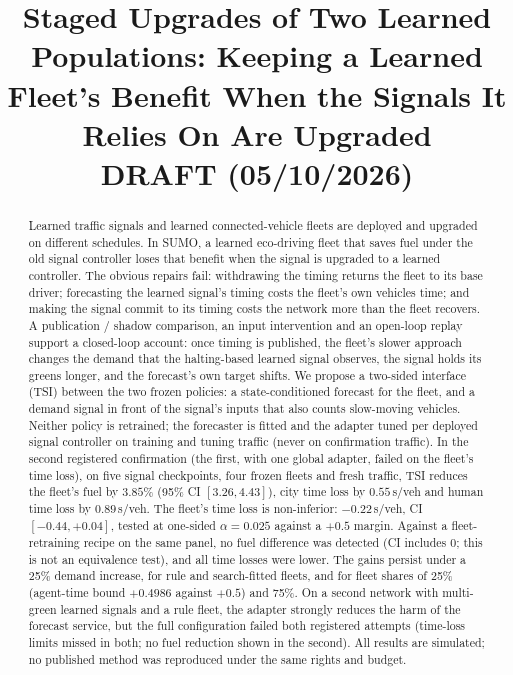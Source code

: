 \documentclass[11pt]{article}
\title{Staged Upgrades of Two Learned Populations: Keeping a Learned Fleet's Benefit When the Signals It Relies On Are Upgraded\\[4pt]
\large DRAFT (05/10/2026)}
\date{}
\begin{document}
\maketitle

\begin{abstract}
Learned traffic signals and learned connected-vehicle fleets are deployed and upgraded on different schedules. In SUMO, a learned
eco-driving fleet that saves fuel under the old signal controller loses that benefit when the signal is upgraded to a learned controller.
The obvious repairs fail: withdrawing the timing returns the fleet to its base driver; forecasting the learned signal's timing costs the
fleet's own vehicles time; and making the signal commit to its timing costs the network more than the fleet recovers. A publication /
shadow comparison, an input intervention and an open-loop replay support a closed-loop account: once timing is published, the fleet's
slower approach changes the demand that the halting-based learned signal observes, the signal holds its greens longer, and
the forecast's own target shifts. We propose a two-sided interface (TSI) between the two frozen policies: a state-conditioned forecast for
the fleet, and a demand signal in front of the signal's inputs that also counts slow-moving vehicles. Neither policy is retrained; the
forecaster is fitted and the adapter tuned per deployed signal controller on training and tuning traffic (never on confirmation traffic). In the second registered confirmation
(the first, with one global adapter, failed on the fleet's time loss), on five signal checkpoints, four frozen fleets and fresh traffic,
TSI reduces the fleet's fuel by $3.85\%$ (95\% CI $[3.26, 4.43]$), city time loss by $0.55$\,s/veh and human time loss by $0.89$\,s/veh.
The fleet's time loss is non-inferior: $-0.22$\,s/veh, CI $[-0.44, +0.04]$, tested at one-sided $\alpha=0.025$ against a $+0.5$ margin.
Against a fleet-retraining recipe on the same panel, no fuel difference was detected (CI includes 0; this is not an equivalence test),
and all time losses were lower. The gains persist under a 25\% demand increase, for rule and search-fitted fleets, and for fleet shares
of 25\% (agent-time bound $+0.4986$ against $+0.5$) and 75\%. On a second network with multi-green learned signals and a rule fleet, the
adapter strongly reduces the harm of the forecast service, but the full configuration failed both registered attempts (time-loss limits
missed in both; no fuel reduction shown in the second). All results are simulated; no published method was reproduced under the same rights and budget.
\end{abstract}
\end{document}
